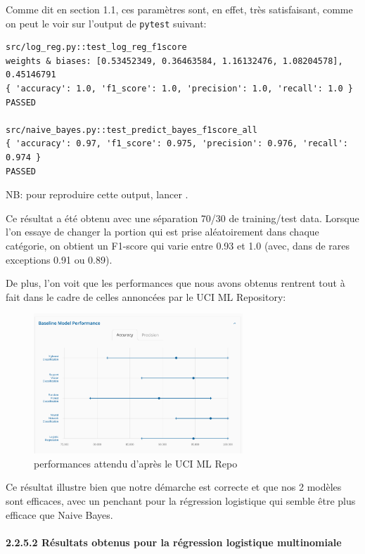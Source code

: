 \documentclass[
]{article}
\begin{document}
\vspace{0.3cm}

Comme dit en section 1.1, ces paramètres sont, en effet, très
satisfaisant, comme on peut le voir sur l'output de \texttt{pytest}
suivant:

\begin{lstlisting}
src/log_reg.py::test_log_reg_f1score 
weights & biases: [0.53452349, 0.36463584, 1.16132476, 1.08204578], 0.45146791  
{ 'accuracy': 1.0, 'f1_score': 1.0, 'precision': 1.0, 'recall': 1.0 }
PASSED

src/naive_bayes.py::test_predict_bayes_f1score_all  
{ 'accuracy': 0.97, 'f1_score': 0.975, 'precision': 0.976, 'recall': 0.974 }
PASSED
\end{lstlisting}

NB: pour reproduire cette output, lancer .

Ce résultat a été obtenu avec une séparation 70/30 de training/test
data. Lorsque l'on essaye de changer la portion qui est prise
aléatoirement dans chaque catégorie, on obtient un F1-score qui varie
entre 0.93 et 1.0 (avec, dans de rares exceptions 0.91 ou 0.89).

De plus, l'on voit que les performances que nous avons obtenus rentrent
tout à fait dans le cadre de celles annoncées par le UCI ML Repository:

\begin{figure}
\centering
\includegraphics[width=0.7\textwidth,height=\textheight]{../res/screenshot_ucmi_perfs.png}
\caption{performances attendu d'après le UCI ML Repo \cite{IrisWebsite}}
\end{figure}

Ce résultat illustre bien que notre démarche est correcte et que nos 2
modèles sont efficaces, avec un penchant pour la régression logistique
qui semble être plus efficace que Naive Bayes.

\paragraph{2.2.5.2 Résultats obtenus pour la régression logistique
multinomiale}\label{ruxe9sultats-obtenus-pour-la-ruxe9gression-logistique-multinomiale}
\end{document}
